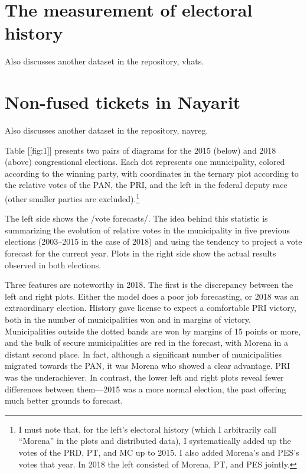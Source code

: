\documentclass[letter,12pt]{article}
\begin{document}
\section{The measurement of electoral history}
Also discusses another dataset in the repository, vhats.

\section{Non-fused tickets in Nayarit}
Also discusses another dataset in the repository, nayreg.

Table [[fig:1]] presents two pairs of diagrams for the 2015 (below) and 2018 (above) congressional elections. Each dot represents one municipality, colored according to the winning party, with coordinates in the ternary plot according to the relative votes of the PAN, the PRI, and the left in the federal deputy race (other smaller parties are excluded).\footnote{I must note that, for the left's electoral history (which I arbitrarily call ``Morena'' in the plots and distributed data), I systematically added up the votes of the PRD, PT, and MC up to 2015. I also added Morena's and PES's votes that year. In 2018 the left consisted of Morena, PT, and PES jointly.} 


The left side shows the /vote forecasts/. The idea behind this statistic is summarizing the evolution of relative votes in the municipality in five previous elections (2003--2015 in the case of 2018) and using the tendency to project a vote forecast for the current year. Plots in the right side show the actual results observed in both elections.

Three features are noteworthy in 2018. The first is the discrepancy between the left and right plots. Either the model does a poor job forecasting, or 2018 was an extraordinary election. History gave license to expect a comfortable PRI victory, both in the number of municipalities won and in margins of victory. Municipalities outside the dotted bands are won by margins of 15 points or more, and the bulk of secure municipalities are red in the forecast, with Morena in a distant second place. In fact, although a significant number of municipalities migrated towards the PAN, it was Morena who showed a clear advantage. PRI was the underachiever. In contrast, the lower left and right plots reveal fewer differences between them---2015 was a more normal election, the past offering much better grounds to forecast. 
\end{document}
